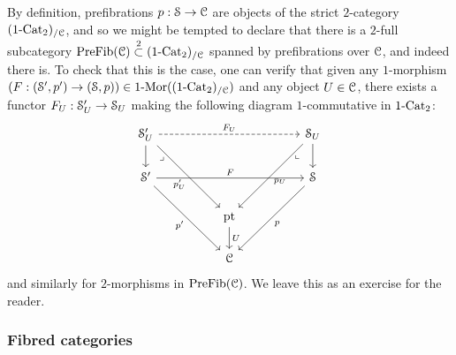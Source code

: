             \begin{remark}
                By definition, prefibrations $p: \S \to \C$ are objects of the strict $2$-category $(1\-\Cat_2)_{/\C}$, and so we might be tempted to declare that there is a $2$-full subcategory $\Pre\Fib(\C) \overset{2}{\subset} (1\-\Cat_2)_{/\C}$ spanned by prefibrations over $\C$, and indeed there is. To check that this is the case, one can verify that given any $1$-morphism $(F: (\S', p') \to (\S, p)) \in 1\-\Mor((1\-\Cat_2)_{/\C})$ and any object $U \in \C$, there exists a functor $F_U: \S'_U \to \S_U$ making the following diagram $1$-commutative in $1\-\Cat_2$:
                    $$
                        \begin{tikzcd}
                        	{\S'_U} &&&& {\S_U} \\
                        	{\S'} &&&& \S \\
                        	&& \pt \\
                        	&& \C
                        	\arrow["{p'}"', from=2-1, to=4-3]
                        	\arrow["U", from=3-3, to=4-3]
                        	\arrow["{p'_U}"', from=1-1, to=3-3]
                        	\arrow["\lrcorner"{anchor=center, pos=0.125}, draw=none, from=1-1, to=4-3]
                        	\arrow[from=1-1, to=2-1]
                        	\arrow["{p_U}", from=1-5, to=3-3]
                        	\arrow[from=1-5, to=2-5]
                        	\arrow["p", from=2-5, to=4-3]
                        	\arrow["F", from=2-1, to=2-5]
                        	\arrow["{F_U}", from=1-1, to=1-5, dashed]
                        	\arrow["\lrcorner"{anchor=center, pos=0.125, rotate=-90}, draw=none, from=1-5, to=4-3]
                        \end{tikzcd}
                    $$
                and similarly for $2$-morphisms in $\Pre\Fib(\C)$. We leave this as an exercise for the reader.
            \end{remark}
        
        \subsubsection{Fibred categories}